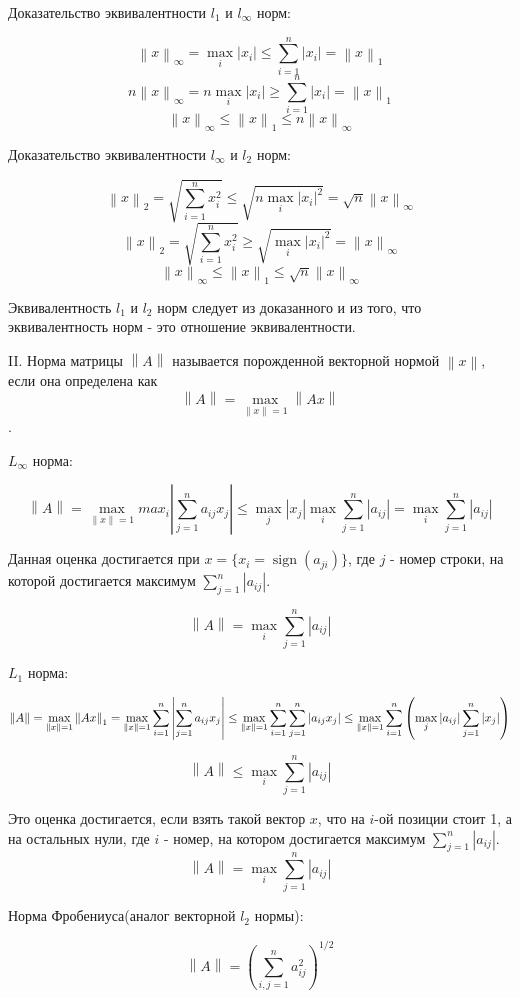\documentclass[12pt]{article}
\DeclareMathOperator*{\sign}{sign}
\newcommand\norm[1]{\left\lVert#1\right\rVert}
\begin{document}
Доказательство эквивалентности $l_1$ и $l_{\infty}$ норм:

$$\norm{x}_{\infty} = \max_i{|x_i|}\leq \sum\limits_{i=1}^{n}|x_i|=\norm{x}_1$$ 
$$n\norm{x}_{\infty} = n\max_i{|x_i|}\geq \sum\limits_{i=1}^{n}|x_i|=\norm{x}_1$$ 
$$\norm{x}_{\infty}\leq\norm{x}_1\leq n\norm{x}_{\infty}$$

Доказательство эквивалентности $l_{\infty}$ и $l_2$ норм:

$$\norm{x}_2 = \sqrt{\sum\limits_{i=1}^nx_i^2}\leq \sqrt{n\max_i{|x_i|^2}}=\sqrt{n}\norm{x}_{\infty}$$
$$\norm{x}_2 = \sqrt{\sum\limits_{i=1}^nx_i^2}\geq \sqrt{\max_i{|x_i|^2}}=\norm{x}_{\infty}$$
$$\norm{x}_{\infty}\leq\norm{x}_1\leq \sqrt{n}\norm{x}_{\infty}$$

Эквивалентность $l_{1}$ и $l_2$ норм следует из доказанного и из того, что эквивалентность норм - это отношение эквивалентности.

II. Норма матрицы $\norm{A}$ называется порожденной векторной нормой $\norm{x}$, если она определена как $$\norm{A}=\max_{\norm{x}=1}\norm{Ax}$$.

$L_{\infty}$ норма:

$$\norm{A} = \max_{\norm{x}=1}max_{i}\left|\sum\limits_{j=1}^na_{ij}x_j\right|\leq \max_j|x_j|\max_i\sum\limits_{j=1}^n|a_{ij}|=\max_i\sum\limits_{j=1}^n|a_{ij}|$$

Данная оценка достигается при $x =\{x_i = \sign(a_{ji})\}$, где $j$ - номер строки, на которой достигается максимум $\sum\limits_{j=1}^n|a_{ij}|$.

$$\norm{A} =\max_i\sum\limits_{j=1}^n|a_{ij}|$$

$L_{1}$ норма:

$$\norm{A} = \max_{\norm{x}=1} \norm{Ax}_1= \max_{\norm{x}=1} \sum\limits_{i=1}^n\left|\sum\limits_{j=1}^na_{ij}x_j\right|\leq \max_{\norm{x}=1} \sum\limits_{i=1}^n\sum\limits_{j=1}^n|a_{ij}x_j|\\ \leq \max_{\norm{x}=1} \sum\limits_{i=1}^n\left(\max_j|a_{ij}|\sum\limits_{j=1}^n|x_j|\right)$$

$$\norm{A} \leq \max_i\sum\limits_{j=1}^n|a_{ij}|$$

Это оценка достигается, если взять такой вектор $x$, что на $i$-ой позиции стоит 1, а на остальных нули, где $i$ - номер, на котором достигается максимум $\sum\limits_{j=1}^n|a_{ij}|$.
$$\norm{A} =\max_i\sum\limits_{j=1}^n|a_{ij}|$$

Норма Фробениуса(аналог векторной $l_2$ нормы):

$$\norm{A} = \left(\sum\limits_{i,j=1}^na_{ij}^2\right)^{1/2}$$
\end{document}
